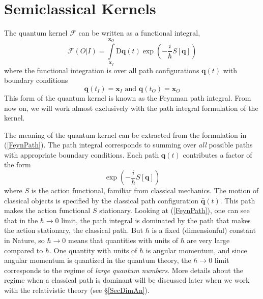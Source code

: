 \section{Semiclassical Kernels\label{NRSemiKer}}
The quantum kernel $\mathcal{F}$ can be written as a functional integral,
\begin{equation}
	\mathcal{F}(O|I) = \int\limits_{\mathbf{x}_{I}}^{\mathbf{x}_{O}} \mathrm{D}\mathbf{q}(t) \exp{\left( - \frac{i}{\hbar} S[\mathbf{q}] \right)} \label{FeynPath}
\end{equation}
where the functional integration is over all path configurations $\mathbf{q}(t)$ with boundary conditions
\begin{equation}
	\mathbf{q}(t_{I}) = \mathbf{x}_{I} \text{ and } \mathbf{q}(t_{O}) = \mathbf{x}_{O}
\end{equation}
This form of the quantum kernel is known as the Feynman path integral. From now on, we will work almost exclusively with the path integral formulation of the kernel.

The meaning of the quantum kernel can be extracted from the formulation in (\ref{FeynPath}). The path integral corresponds to summing over \textit{all} possible paths with appropriate boundary conditions. Each path $\mathbf{q}(t)$ contributes a factor of the form
\begin{equation}
	\exp{\left( - \frac{i}{\hbar} S[ \mathbf{q} ] \right)}
\end{equation}
where $S$ is the action functional, familiar from classical mechanics. The motion of classical objects is specified by the classical path configuration $\bar{\mathbf{q}}(t)$. This path makes the action functional $S$ stationary. Looking at (\ref{FeynPath}), one can see that in the $\hbar \rightarrow 0$ limit, the path integral is dominated by the path that makes the action stationary, the classical path. But $\hbar$ is a fixed (dimensionful) constant in Nature, so $\hbar \rightarrow 0$ means that quantities with units of $\hbar$ are very large compared to $\hbar$. One quantity with units of $\hbar$ is angular momentum, and since angular momentum is quantized in the quantum theory, the $\hbar \rightarrow 0$ limit corresponds to the regime of \textit{large quantum numbers}. More details about the regime when a classical path is dominant will be discussed later when we work with the relativistic theory (see \S\ref{SecDimAn}).

